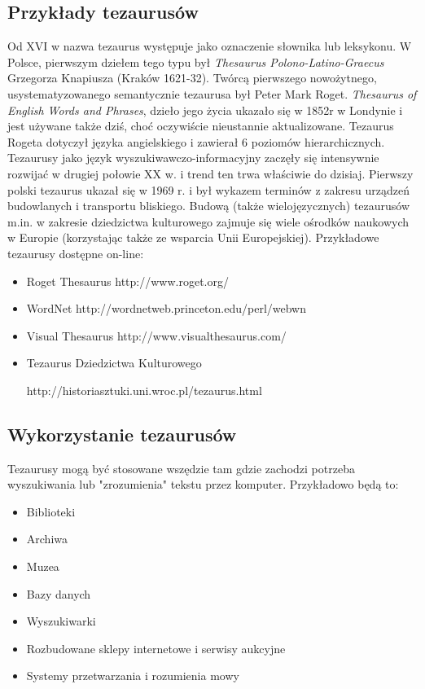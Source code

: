 \documentclass[12pt,a4paper,notitlepage]{article}
\begin{document}
\subsection{Przykłady tezaurusów}
Od XVI w nazwa tezaurus występuje jako oznaczenie słownika lub leksykonu. W Polsce, pierwszym dziełem tego typu był \textit{ Thesaurus Polono-Latino-Graecus} Grzegorza Knapiusza (Kraków 1621-32). Twórcą pierwszego nowożytnego, usystematyzowanego semantycznie tezaurusa był Peter Mark Roget. \textit{Thesaurus of English Words and Phrases}, dzieło jego życia ukazało się w 1852r w Londynie i jest używane także dziś, choć oczywiście nieustannie aktualizowane. Tezaurus Rogeta dotyczył języka angielskiego i zawierał 6 poziomów hierarchicznych. Tezaurusy jako język wyszukiwawczo-informacyjny zaczęły się intensywnie rozwijać w drugiej połowie XX w. i trend ten trwa właściwie do dzisiaj. Pierwszy polski tezaurus ukazał się w 1969 r. i był wykazem terminów z zakresu urządzeń budowlanych i transportu bliskiego\cite{Sosinska}. Budową (także wielojęzycznych) tezaurusów m.in. w zakresie dziedzictwa kulturowego zajmuje się wiele ośrodków naukowych w Europie (korzystając także ze wsparcia Unii Europejskiej).
Przykładowe tezaurusy dostępne on-line:
\begin{itemize}
    \item Roget Thesaurus http://www.roget.org/
	\item WordNet http://wordnetweb.princeton.edu/perl/webwn
	\item Visual Thesaurus http://www.visualthesaurus.com/
	\item Tezaurus Dziedzictwa Kulturowego 

http://historiasztuki.uni.wroc.pl/tezaurus.html
\end{itemize}  

\subsection{Wykorzystanie tezaurusów}
Tezaurusy mogą być stosowane wszędzie tam gdzie zachodzi potrzeba wyszukiwania lub "zrozumienia" tekstu przez komputer. Przykładowo będą to: 
\begin{itemize}
   \item Biblioteki
	\item Archiwa
	\item Muzea
	\item Bazy danych
	\item Wyszukiwarki
	\item Rozbudowane sklepy internetowe i serwisy aukcyjne
	\item Systemy przetwarzania i rozumienia mowy
\end{itemize}
\end{document}

